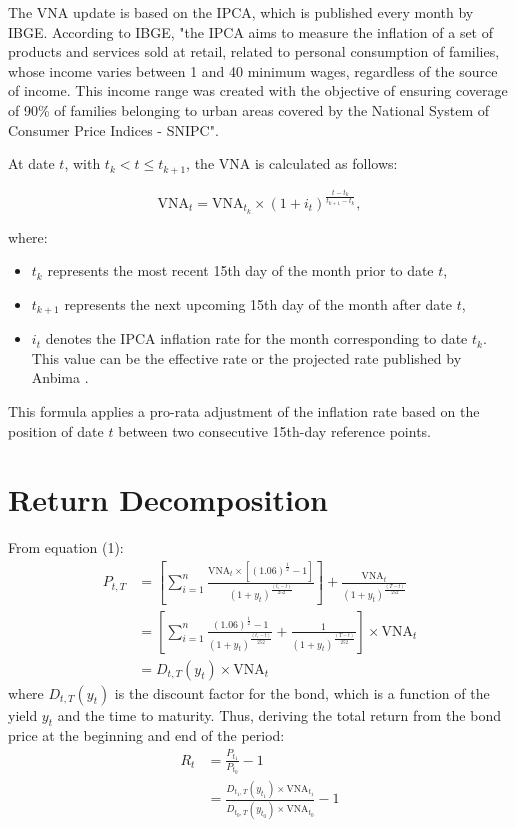 \documentclass[10pt]{report}
\begin{document}
The VNA update is based on the IPCA, which is published every month by IBGE. According to IBGE, "the IPCA aims to measure the inflation of a set of products and services sold at retail, related to personal consumption of families, whose income varies between 1 and 40 minimum wages, regardless of the source of income. This income range was created with the objective of ensuring coverage of 90\% of families belonging to urban areas covered by the National System of Consumer Price Indices - SNIPC". \cite{ibge_ipca}

At date $t$, with $t_k<t \leq t_{k+1}$, the VNA is calculated as follows:

\begin{equation}
	\text{VNA}_{t} = \text{VNA}_{t_k} \times \left(1 + i_{t}\right)^{\frac{t - t_{k}}{t_{k+1}- t_{k}}},
\end{equation}

where:
\begin{itemize}
	\item $t_k$ represents the most recent 15th day of the month prior to date $t$,
	\item $t_{k+1}$ represents the next upcoming 15th day of the month after date $t$,
	\item $i_{t}$ denotes the IPCA inflation rate for the month corresponding to date $t_k$. This value can be the effective rate or the projected rate published by Anbima \cite{jose_valentim}.
\end{itemize}

This formula applies a pro-rata adjustment of the inflation rate based on the position of date $t$ between two consecutive 15th-day reference points.

\section*{Return Decomposition}

From equation (1):
\begin{align*}
	P_{t,T} & = \left[\sum_{i=1}^{n} \frac{\text{VNA}_{t} \times \left[(1.06)^{\frac{1}{2}}-1\right]}{(1+y_{t})^\frac{(t_{i}-t)}{252}}\right] + \frac{\text{VNA}_{t}}{(1+y_{t})^\frac{(T-t)}{252}} \\
	        & = \left[\sum_{i=1}^{n} \frac{(1.06)^{\frac{1}{2}}-1}{(1+y_{t})^\frac{(t_{i}-t)}{252}} + \frac{1}{(1+y_{t})^\frac{(T-t)}{252}}\right] \times \text{VNA}_{t}                           \\
	        & = D_{t,T}(y_{t}) \times \text{VNA}_{t}
\end{align*}
where $D_{t,T}(y_{t})$ is the discount factor for the bond, which is a function of the yield $y_{t}$ and the time to maturity. Thus, deriving the total return from the bond price at the beginning and end of the period:
\begin{align*}
	R_{t} & = \frac{P_{t_1}}{P_{t_0}} - 1                                                                      \\
	      & = \frac{D_{t_1,T}(y_{t_1}) \times \text{VNA}_{t_1}}{D_{t_0,T}(y_{t_0}) \times \text{VNA}_{t_0}} -1 \\
\end{align*}
\end{document}
